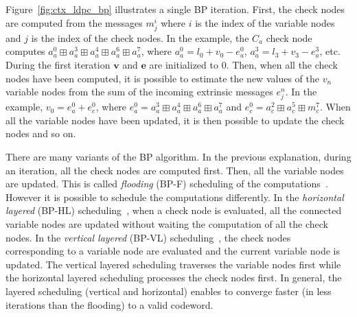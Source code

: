 Figure~\ref{fig:ctx_ldpc_bp} illustrates a single BP iteration. First, the check
nodes are computed from the messages $m_j^i$ where $i$ is the index of the
variable nodes and $j$ is the index of the check nodes. In the example, the
$C_a$ check node computes $a^0_a \boxplus a^3_a \boxplus a^4_a \boxplus a^6_a
\boxplus a^7_a$, where $a^0_a = l_0 + v_0 - e^{0}_a$, $a^3_a = l_3 + v_3 -
e^{3}_a$, etc. During the first iteration $\bm{v}$ and $\bm{e}$ are initialized
to 0. Then, when all the check nodes have been computed, it is possible to
estimate the new values of the $v_n$ variable nodes from the sum of the
incoming extrinsic messages $e_j^n$. In the example, $v_0 = e^0_a + e^0_c$,
where $e^0_a = a^3_a \boxplus a^4_a \boxplus a^6_a \boxplus a^7_a$ and $e^0_c =
a^2_c \boxplus a^5_c \boxplus m^7_c$. When all the variable nodes have been
updated, it is then possible to update the check nodes and so on.

There are many variants of the BP algorithm. In the previous explanation, during
an iteration, all the check nodes are computed first. Then, all the variable
nodes are updated. This is called \emph{flooding} (BP-F) scheduling of the
computations~\cite{MacKay1995}. However it is possible to schedule the
computations differently. In the \emph{horizontal layered} (BP-HL)
scheduling~\cite{Yeo2001}, when a check node is evaluated, all the connected
variable nodes are updated without waiting the computation of all the check
nodes. In the \emph{vertical layered} (BP-VL) scheduling~\cite{Zhang2002}, the
check nodes corresponding to a variable node are evaluated and the current
variable node is updated. The vertical layered scheduling traverses the variable
nodes first while the horizontal layered scheduling processes the check nodes
first. In general, the layered scheduling (vertical and horizontal) enables to
converge faster (in less iterations than the flooding) to a valid codeword.

